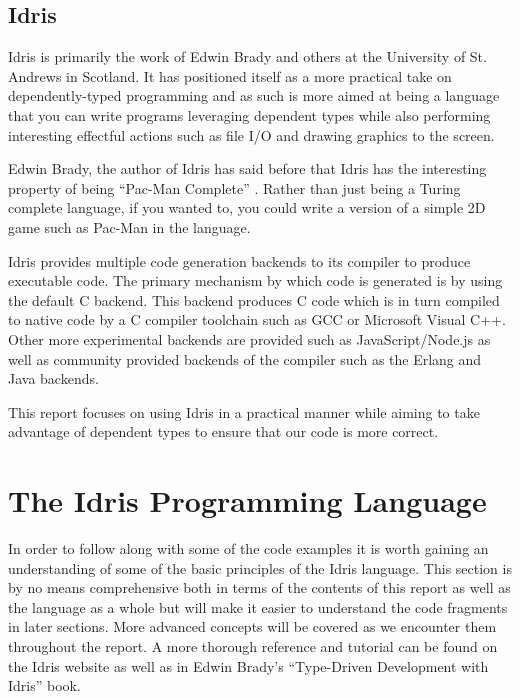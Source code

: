 \documentclass[a4paper, notitlepage]{report}
\begin{document}
\subsection{Idris}
\label{sec:org92dab52}
Idris is primarily the work of Edwin Brady and others at the University of St.
Andrews in Scotland. It has positioned itself as a more practical take on
dependently-typed programming and as such is more aimed at being a language that
you can write programs leveraging dependent types while also performing
interesting effectful actions such as file I/O and drawing graphics to the
screen.

Edwin Brady, the author of Idris has said before that Idris has the interesting
property of being ``Pac-Man Complete'' \cite{scala_world_2015}. Rather than just
being a Turing complete language, if you wanted to, you could write a version of
a simple 2D game such as Pac-Man in the language.

Idris provides multiple code generation backends to its compiler to produce
executable code. The primary mechanism by which code is generated is by using
the default C backend. This backend produces C code which is in turn compiled to
native code by a C compiler toolchain such as GCC or Microsoft Visual C++. Other
more experimental backends are provided such as JavaScript/Node.js as well as
community provided backends of the compiler such as the Erlang
\cite{elliott_erlang_2015} and Java \cite{idris_java} backends.

This report focuses on using Idris in a practical manner while aiming to take
advantage of dependent types to ensure that our code is more correct.

\section{The Idris Programming Language}
\label{sec:org47a7390}
In order to follow along with some of the code examples it is worth gaining an
understanding of some of the basic principles of the Idris language. This
section is by no means comprehensive both in terms of the contents of this
report as well as the language as a whole but will make it easier to understand
the code fragments in later sections. More advanced concepts will be covered as
we encounter them throughout the report. A more thorough reference and tutorial
can be found on the Idris website \cite{idris_tutorial_2017} as well as in Edwin
Brady's ``Type-Driven Development with Idris'' \cite{brady_book_2017} book.
\end{document}
